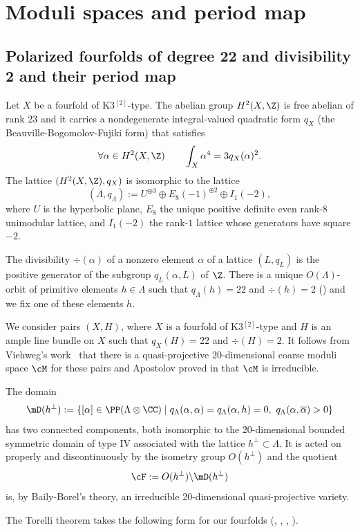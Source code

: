 \section{Moduli spaces and period map}

\subsection{Polarized \hk fourfolds of degree 22 and divisibility 2 and their period map}\label{sec21}

Let $X$ be a \hk fourfold of K3$^{[2]}$-type. The abelian group $H^2(X,\Z)$ is free abelian of rank 23 and it carries a nondegenerate integral-valued quadratic form $q_X$ (the Beauville-Bogomolov-Fujiki form) that satisfies
\[
\forall \alpha\in H^2(X,\Z)\qquad \int_X\alpha^4=3q_X(\alpha)^2
.
\]
The lattice $(H^2(X,\Z),q_X)$ is isomorphic to the lattice
\[
(\Lambda,q_\Lambda):=U^{\oplus 3}\oplus E_8(-1)^{\oplus 2}\oplus I_1(-2),
\]
where $U$ is the hyperbolic plane, $E_8$ the unique positive definite even rank-$8$ unimodular lattice, and $I_1(-2) $ the rank-$1$ lattice whose generators have square $-2$.

The divisibility $\div(\alpha)$ of a nonzero element $\alpha$ of a lattice $( L,q_L)$ is the positive generator of the subgroup $q_L(\alpha, L)$ of $ \Z$. There is a unique $O(\Lambda)$-orbit of primitive elements $h\in \Lambda$ such that $q_\Lambda(h)=22$ and $\div(h)=2$ (\cite[Cor.\,3.7 \& Ex.\,3.10]{ghscomp}) and we fix one of these elements $h$.

We consider pairs $(X,H)$, where $X$ is a \hk fourfold of K3$^{[2]}$-type and $H$ is an ample line bundle on $X$ such that $q_X(H)=22$ and $\div(H)=2$. It follows from Viehweg's work~\cite{vie} that there is a quasi-projective 20-dimensional coarse moduli space $\cM$ for these pairs and Apostolov proved in \cite{apo} that $\cM$ is irreducible.

The domain
\[
\mD(h^\bot):=\{[\alpha]\in\PP(\Lambda\otimes\CC) \mid q_\Lambda(\alpha, \alpha) =q_\Lambda(\alpha, h) =0,\ q_\Lambda(\alpha,\overline \alpha) >0\}
\]
has two connected components, both isomorphic to the 20-dimensional bounded symmetric domain of type IV associated with the lattice $h^\bot\subset \Lambda$.
It is acted on properly and discontinuously by the {isometry group} $ O(h^\bot)$
and the quotient
\[
\cF:= O(h^\bot)\backslash \mD(h^\bot)
\]
is, by Baily-Borel's theory, an irreducible 20-dimensional quasi-projective variety.

The Torelli theorem takes the following form for our \hk fourfolds (\cite{ver}, \cite[Th.\,3.14]{ghssur}, \cite[Th.\,8.4]{marsur}, \cite[Th.\,1.3]{huybki}).

